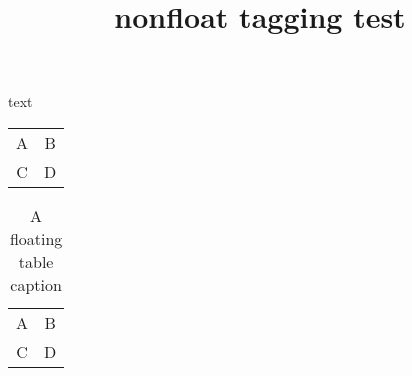 \documentclass{article}
\title{nonfloat tagging test}
\begin{document}
text
\begin{center}
\begin{tabular}{cc}
 A & B \\
 C & D
\end{tabular}
\end{center}

\begin{table}
\caption{A floating table caption}
\begin{tabular}{cc}
 A & B \\
 C & D
\end{tabular}
\end{table}
\end{document}
